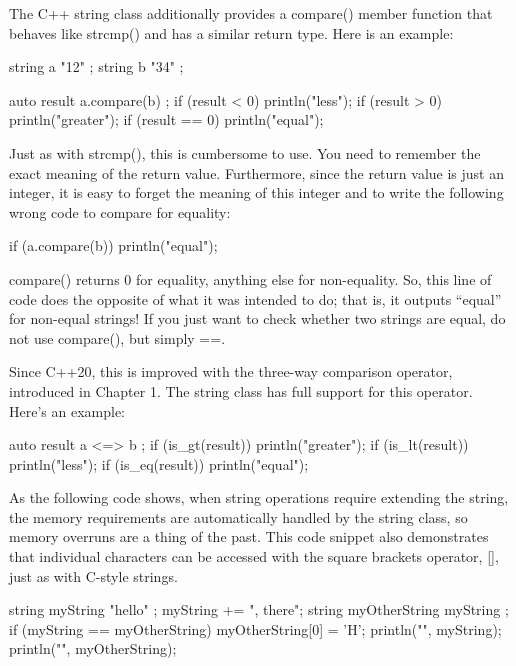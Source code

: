 The C++ string class additionally provides a compare() member function that behaves like strcmp() and has a similar return type. Here is an example:

\begin{cpp}
string a { "12" };
string b { "34" };

auto result { a.compare(b) };
if (result < 0) { println("less"); }
if (result > 0) { println("greater"); }
if (result == 0) { println("equal"); }
\end{cpp}

Just as with strcmp(), this is cumbersome to use. You need to remember the exact meaning of the return value. Furthermore, since the return value is just an integer, it is easy to forget the meaning of this integer and to write the following wrong code to compare for equality:

\begin{cpp}
if (a.compare(b)) { println("equal"); }
\end{cpp}

compare() returns 0 for equality, anything else for non-equality. So, this line of code does the opposite of what it was intended to do; that is, it outputs “equal” for non-equal strings! If you just want to check whether two strings are equal, do not use compare(), but simply ==.

Since C++20, this is improved with the three-way comparison operator, introduced in Chapter 1. The string class has full support for this operator. Here’s an example:

\begin{cpp}
auto result { a <=> b };
if (is_gt(result)) { println("greater"); }
if (is_lt(result)) { println("less"); }
if (is_eq(result)) { println("equal"); }
\end{cpp}


As the following code shows, when string operations require extending the string, the memory requirements are automatically handled by the string class, so memory overruns are a thing of the past. This code snippet also demonstrates that individual characters can be accessed with the square brackets operator, [], just as with C-style strings.

\begin{cpp}
string myString { "hello" };
myString += ", there";
string myOtherString { myString };
if (myString == myOtherString) {
    myOtherString[0] = 'H';
}
println("{}", myString);
println("{}", myOtherString);
\end{cpp}

